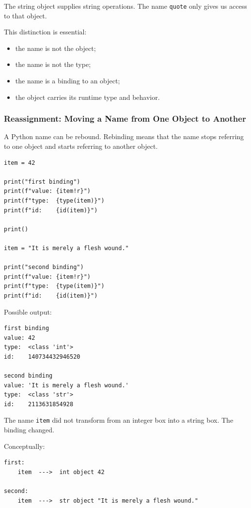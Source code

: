 The string object supplies string operations. The name \texttt{quote} only gives us access to that object.

This distinction is essential:

\begin{itemize}
    \item the name is not the object;
    \item the name is not the type;
    \item the name is a binding to an object;
    \item the object carries its runtime type and behavior.
\end{itemize}

\subsubsection{Reassignment: Moving a Name from One Object to Another}

A Python name can be rebound. Rebinding means that the name stops referring to one object and starts referring to another object.

\begin{verbatim}
item = 42

print("first binding")
print(f"value: {item!r}")
print(f"type:  {type(item)}")
print(f"id:    {id(item)}")

print()

item = "It is merely a flesh wound."

print("second binding")
print(f"value: {item!r}")
print(f"type:  {type(item)}")
print(f"id:    {id(item)}")
\end{verbatim}

Possible output:

\begin{verbatim}
first binding
value: 42
type:  <class 'int'>
id:    140734432946520

second binding
value: 'It is merely a flesh wound.'
type:  <class 'str'>
id:    2113631854928
\end{verbatim}

The name \texttt{item} did not transform from an integer box into a string box. The binding changed.

Conceptually:

\begin{verbatim}
first:
    item  --->  int object 42

second:
    item  --->  str object "It is merely a flesh wound."
\end{verbatim}

